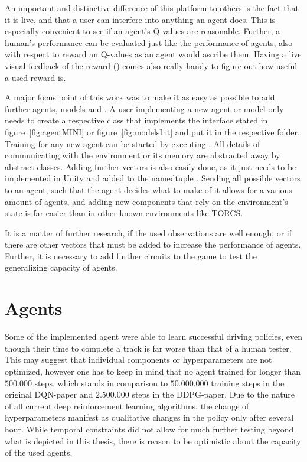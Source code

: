 An important and distinctive difference of this platform to others is the fact that it is live, and that a user can interfere into anything an agent does. This is especially convenient to see if an agent's Q-values are reasonable. Further, a human's performance can be evaluated just like the performance of agents, also with respect to reward an Q-values as an agent would ascribe them. Having a live visual feedback of the reward () comes also really handy to figure out how useful a used reward is.

A major focus point of this work was to make it as easy as possible to add further agents, models and . A user implementing a new agent or model only needs to create a respective class that implements the interface stated in figure~\ref{fig:agentMINI} or figure~\ref{fig:modelsInt} and put it in the respective folder. Training for any new agent can be started by executing . All details of communicating with the environment or its memory are abstracted away by abstract classes. Adding further vectors is also easily done, as it just needs to be implemented in Unity and added to the namedtuple . Sending all possible vectors to an agent, such that the agent decides what to make of it allows for a various amount of agents, and adding new components that rely on the environment's state is far easier than in other known environments like TORCS.

It is a matter of further research, if the used observations are well enough, or if there are other vectors that must be added to increase the performance of agents. Further, it is necessary to add further circuits to the game to test the generalizing capacity of agents. 


\section{Agents}

Some of the implemented agent were able to learn successful driving policies, even though their time to complete a track is far worse than that of a human tester. This may suggest that individual components or hyperparameters are not optimized, however one has to keep in mind that no agent trained for longer than $500.000$ steps, which stands in comparison to $50.000.000$ training steps in the original DQN-paper and $2.500.000$ steps in the DDPG-paper. Due to the nature of all current deep reinforcement learning algorithms, the change of hyperparameters manifest as qualitative changes in the policy only after several hour. While temporal constraints did not allow for much further testing beyond what is depicted in this thesis, there is reason to be optimistic about the capacity of the used agents. 

